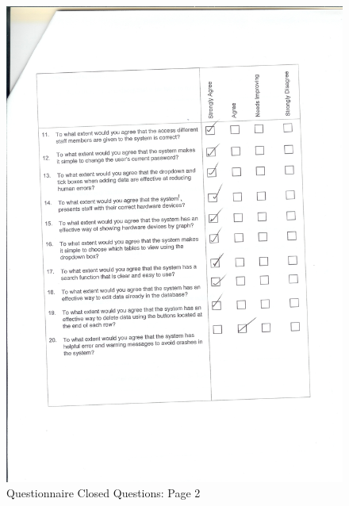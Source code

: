 \begin{figure}[H]
    \includegraphics[width=\textwidth]{./Evaluation/EvaluationQuestionnaire/Scan11.jpeg}
    \caption{Questionnaire Closed Questions: Page 2} 
\end{figure}

